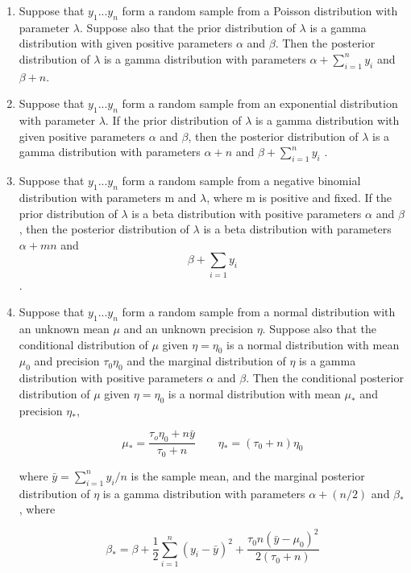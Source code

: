 \documentclass[letterpaper]{article}
\begin{document}
\begin{enumerate}
		\item Suppose that $y_1...y_n$ form a random sample from a Poisson distribution with parameter $\lambda$. Suppose also that the prior distribution of $\lambda$ is a gamma distribution with given positive parameters $\alpha$ and $\beta$. Then the posterior distribution
		of $\lambda$ is a gamma distribution with parameters $\alpha + \sum_{i=1}^{n}y_i$ and $\beta + n$.
		
		\item Suppose that $y_1...y_n$ form a random sample from an exponential
		distribution with parameter $\lambda$. If the prior distribution of $\lambda$ is a gamma distribution with given positive parameters $\alpha$ and $\beta$, then the posterior distribution of $\lambda$ is a gamma distribution with parameters $\alpha + n$ and $\beta + \sum_{i=1}^n y_i$ .
		
		\item Suppose that $y_1...y_n$ form a random sample from a negative binomial
		distribution with parameters m and $\lambda$, where m is positive and fixed. If the prior distribution of $\lambda$ is a beta distribution with positive parameters $\alpha$ and $\beta$, then the posterior distribution of $\lambda$ is a beta distribution with parameters $\alpha +mn$ and 
		$$\beta+ \sum_{i=1} y_i$$.
		
		\item Suppose that $y_1...y_n$ form a random sample from a normal distribution
		with an unknown mean $\mu$ and an unknown precision $\eta$. Suppose also that the conditional distribution of $\mu$ given $\eta = \eta_0$ is a normal distribution with mean $\mu_0$ and precision $\tau_0\eta_0 $ and the marginal distribution of $\eta$ is a gamma distribution with positive parameters $\alpha$ and $\beta$. Then the conditional posterior distribution of $\mu$ given $\eta = \eta_0$ is a normal distribution with mean $\mu_*$ and precision $\eta_*$,
		
		\begin{equation*}
		\mu_*=\frac{\tau_o\eta_0+n\bar{y}}{\tau_0+n} \qquad \eta_*=(\tau_0+n)\eta_0
		\end{equation*}
		
		where $\bar{y} = \sum_{i=1}^{n} y_i/n$ is the sample mean, and the marginal posterior distribution of $\eta$ is a gamma distribution with parameters $\alpha + (n/2)$ and $\beta_*$, where
		
		\begin{equation*}
		\beta_*=\beta+\frac{1}{2}\sum_{i=1}^n(y_i-\bar{y})^2+\frac{\tau_0 n (\bar{y}-\mu_0)^2}{2(\tau_0+n)}
		\end{equation*}
		

\end{enumerate}
\end{document}
